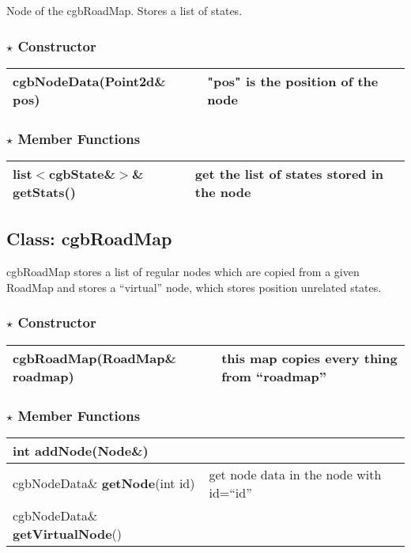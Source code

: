 \documentclass[onecolumn,10pt]{article}
\begin{document}
Node of the cgbRoadMap. Stores a list of states.

\subsubsection*{$\star$ Constructor}
\begin{tabular}{|l|l|}\hline
{\bf cgbNodeData}(Point2d\& pos) & "pos" is the position of the node\\\hline
\end{tabular}

\subsubsection*{$\star$ Member Functions}

\begin{tabular}{|l|l|} \hline
list$<$cgbState\&$>$\& {\bf getStats}() & get the list of states stored in the node\\\hline
\end{tabular}

\subsection{Class: cgbRoadMap}
\label{subsec:cgbRoadMap}

cgbRoadMap stores a list of regular nodes which are copied from a
given RoadMap and stores a ``virtual'' node, which stores position
unrelated states. 

\subsubsection*{$\star$ Constructor}
\begin{tabular}{|l|l|}\hline
{\bf cgbRoadMap}(RoadMap\& roadmap) & this map copies every thing from ``roadmap''\\\hline
\end{tabular}

\subsubsection*{$\star$ Member Functions}

\begin{tabular}{|l|l|} \hline
int {\bf addNode}(Node\&)             & \\\hline
cgbNodeData\& {\bf getNode}(int id)  & get node data in the node with id=``id''\\\hline
cgbNodeData\& {\bf getVirtualNode}() & \\\hline
\end{tabular}


{


}
\end{document}
